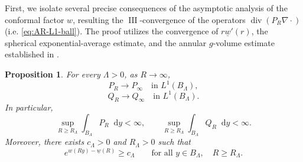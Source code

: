 \documentclass[10pt,a4paper]{amsart}
\newtheorem{proposition}[theorem]{Proposition}
\numberwithin{equation}{section}
\newcommand{\dd}{\mathop{}\!\mathrm{d}}%
\begin{document}
{First, we isolate several precise consequences of the asymptotic analysis of the conformal factor $w$, resulting the $\operatorname{III}$-convergence of the operators $\operatorname{div}(P_R\nabla\cdot)$ (i.e. \cref{eq:AR-L1-ball}).}
The proof utilizes the convergence of
$r\underline w'(r)$, the spherical exponential-average estimate, and the
annular $g$-volume estimate established in \cite{M}.
\begin{proposition}
\label{prop:weight-convergence}
For every $\Lambda>0$, as $R\to\infty$,
\begin{equation}\label{eq:AR-L1-ball}
    P_R\to P_\infty
    \quad\text{in }L^1(B_\Lambda),
\end{equation}
\begin{equation}\label{eq:BR-L1-ball}
    Q_R\to Q_\infty
    \quad\text{in }L^1(B_\Lambda).
\end{equation}
In particular, 
\[
    \sup_{R\geq R_\Lambda}\int_{B_\Lambda}P_R\dd y<\infty,
    \qquad
    \sup_{R\geq R_\Lambda}\int_{B_\Lambda}Q_R\dd y<\infty.
\]
Moreover, there exists $c_\Lambda>0$ and $R_\Lambda>0$ such that
\begin{equation}\label{eq:conformal-lower-bound}
    e^{w(Ry)-\underline w(R)}\geq c_\Lambda
    \qquad\text{for all }y\in B_\Lambda,
    \quad R\geq R_\Lambda.
\end{equation}
\end{proposition}
\end{document}
